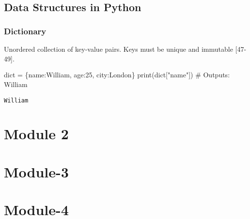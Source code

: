 \documentclass[
  letterpaper,
  DIV=11,
  numbers=noendperiod]{scrreprt}
\newenvironment{Shaded}{\begin{snugshade}}{\end{snugshade}}
\newcommand{\BuiltInTok}[1]{\textcolor[rgb]{0.00,0.23,0.31}{#1}}
\newcommand{\CommentTok}[1]{\textcolor[rgb]{0.37,0.37,0.37}{#1}}
\newcommand{\DecValTok}[1]{\textcolor[rgb]{0.68,0.00,0.00}{#1}}
\newcommand{\NormalTok}[1]{\textcolor[rgb]{0.00,0.23,0.31}{#1}}
\newcommand{\OperatorTok}[1]{\textcolor[rgb]{0.37,0.37,0.37}{#1}}
\newcommand{\StringTok}[1]{\textcolor[rgb]{0.13,0.47,0.30}{#1}}
\begin{document}
\section{Data Structures in Python}\label{data-structures-in-python}

\subsection{Dictionary}\label{dictionary}

Unordered collection of key-value pairs. Keys must be unique and
immutable {[}47-49{]}.

\begin{Shaded}
\begin{Highlighting}[]
\BuiltInTok{dict} \OperatorTok{=}\NormalTok{ \{}\StringTok{\textquotesingle{}name\textquotesingle{}}\NormalTok{:}\StringTok{\textquotesingle{}William\textquotesingle{}}\NormalTok{, }\StringTok{\textquotesingle{}age\textquotesingle{}}\NormalTok{:}\DecValTok{25}\NormalTok{, }\StringTok{\textquotesingle{}city\textquotesingle{}}\NormalTok{:}\StringTok{\textquotesingle{}London\textquotesingle{}}\NormalTok{\}}
\BuiltInTok{print}\NormalTok{(}\BuiltInTok{dict}\NormalTok{[}\StringTok{"name"}\NormalTok{]) }\CommentTok{\# Outputs: \textquotesingle{}William\textquotesingle{}}
\end{Highlighting}
\end{Shaded}

\begin{verbatim}
William
\end{verbatim}


\chapter{Module 2}\label{module-2}


\chapter{Module-3}\label{module-3}


\chapter{Module-4}\label{module-4}

\end{document}
